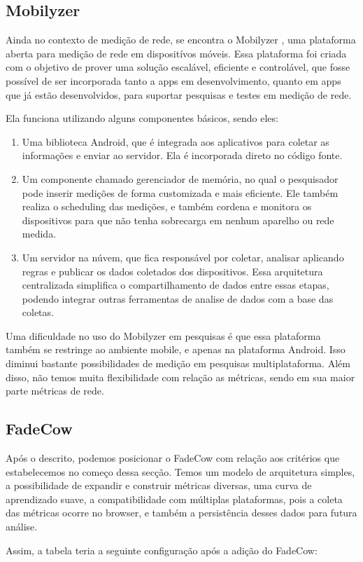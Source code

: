 \documentclass[12pt]{tcc}
\begin{document}
		\subsection{Mobilyzer}
		\par Ainda no contexto de medição de rede, se encontra o Mobilyzer \citep{Nikravesh2015Mobilyzer}, uma plataforma aberta para medição de rede em dispositívos móveis. Essa plataforma foi criada com o objetivo de prover uma solução escalável, eficiente e controlável, que fosse possível de ser incorporada tanto a apps em desenvolvimento, quanto em apps que já estão desenvolvidos, para suportar pesquisas e testes em medição de rede. 
		\par Ela funciona utilizando alguns componentes básicos, sendo eles: 
		\begin{enumerate}
			\item Uma biblioteca Android, que é integrada aos aplicativos para coletar as informações e enviar ao servidor. Ela é incorporada direto no código fonte.
			\item Um componente chamado gerenciador de memória, no qual o pesquisador pode inserir medições de forma customizada e mais eficiente. Ele também realiza o scheduling das medições, e também cordena e monitora os dispositivos para que não tenha sobrecarga em nenhum aparelho ou rede medida. 
			\item Um servidor na núvem, que fica responsável por coletar, analisar aplicando regras e publicar os dados coletados dos dispositivos. Essa arquitetura centralizada simplifica o compartilhamento de dados entre essas etapas, podendo integrar outras ferramentas de analise de dados com a base das coletas.

		\end{enumerate}
		\par Uma dificuldade no uso do Mobilyzer em pesquisas é que essa plataforma também se restringe ao ambiente mobile, e apenas na plataforma Android. Isso diminui bastante possibilidades de medição em pesquisas multiplataforma. Além disso, não temos muita flexibilidade com relação as métricas, sendo em sua maior parte métricas de rede.

		\subsection{FadeCow}
		\par Após o descrito, podemos posicionar o FadeCow com relação aos critérios que estabelecemos no começo dessa secção. Temos um modelo de arquitetura simples, a possibilidade de expandir e construir métricas diversas, uma curva de aprendizado suave, a compatibilidade com múltiplas plataformas, pois a coleta das métricas ocorre no browser, e também a persistência desses dados para futura análise.
		\par Assim, a tabela teria a seguinte configuração após a adição do FadeCow:
\end{document}
